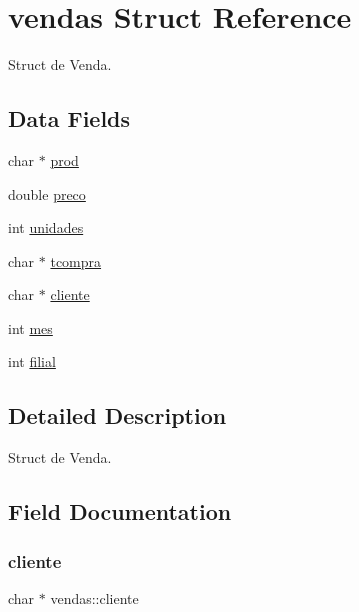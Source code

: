 \hypertarget{structvendas}{}\section{vendas Struct Reference}
\label{structvendas}


Struct de Venda.  


\subsection*{Data Fields}
\begin{DoxyCompactItemize}
\item 
char $\ast$ \mbox{\hyperlink{structvendas_a4cbb2fefe45e4421ff0478915595e1ff}{prod}}
\item 
double \mbox{\hyperlink{structvendas_a8d58f057099d8886d08df41a90471e6f}{preco}}
\item 
int \mbox{\hyperlink{structvendas_a807e7c08c0bf74bee01031c7e0d36367}{unidades}}
\item 
char $\ast$ \mbox{\hyperlink{structvendas_ac2a6f2dfe4c8a20d264d4567c81eb1a5}{tcompra}}
\item 
char $\ast$ \mbox{\hyperlink{structvendas_a5ad8b575ce9b7f7b2b300ef95722a729}{cliente}}
\item 
int \mbox{\hyperlink{structvendas_a5d0fd3f619ac77f809018147568542fc}{mes}}
\item 
int \mbox{\hyperlink{structvendas_a19fe4cb434561c772ffc99fcafaa2412}{filial}}
\end{DoxyCompactItemize}


\subsection{Detailed Description}
Struct de Venda. 



\subsection{Field Documentation}
\mbox{\label{structvendas_a5ad8b575ce9b7f7b2b300ef95722a729}} 
\subsubsection{\texorpdfstring{cliente}{cliente}}
{\footnotesize\ttfamily char $\ast$ vendas\+::cliente}

